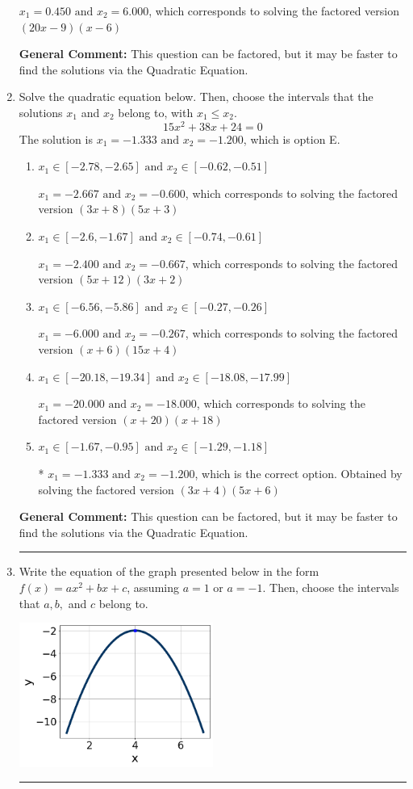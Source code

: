 \documentclass{extbook}[14pt]
\newcommand{\litem}[1]{\item #1

\rule{\textwidth}{0.4pt}}
\begin{document}
\begin{enumerate}
{\begin{enumerate}[label=\Alph*.]
$x_1 = 0.450 \text{ and } x_2 = 6.000$, which corresponds to solving the factored version $(20x -9)(x -6)$
\end{enumerate}

\textbf{General Comment:} This question can be factored, but it may be faster to find the solutions via the Quadratic Equation.
}
\litem{
Solve the quadratic equation below. Then, choose the intervals that the solutions $x_1$ and $x_2$ belong to, with $x_1 \leq x_2$.
\[ 15x^{2} +38 x + 24 = 0 \]The solution is \( x_1 = -1.333 \text{ and } x_2 = -1.200 \), which is option E.\begin{enumerate}[label=\Alph*.]
\item \( x_1 \in [-2.78, -2.65] \text{ and } x_2 \in [-0.62, -0.51] \)

$x_1 = -2.667 \text{ and } x_2 = -0.600$, which corresponds to solving the factored version $(3x + 8)(5x + 3)$
\item \( x_1 \in [-2.6, -1.67] \text{ and } x_2 \in [-0.74, -0.61] \)

$x_1 = -2.400 \text{ and } x_2 = -0.667$, which corresponds to solving the factored version $(5x + 12)(3x + 2)$
\item \( x_1 \in [-6.56, -5.86] \text{ and } x_2 \in [-0.27, -0.26] \)

$x_1 = -6.000 \text{ and } x_2 = -0.267$, which corresponds to solving the factored version $(x + 6)(15x + 4)$
\item \( x_1 \in [-20.18, -19.34] \text{ and } x_2 \in [-18.08, -17.99] \)

$x_1 = -20.000 \text{ and } x_2 = -18.000$, which corresponds to solving the factored version $(x + 20)(x + 18)$
\item \( x_1 \in [-1.67, -0.95] \text{ and } x_2 \in [-1.29, -1.18] \)

* $x_1 = -1.333 \text{ and } x_2 = -1.200$, which is the correct option. Obtained by solving the factored version $(3x + 4)(5x + 6)$
\end{enumerate}

\textbf{General Comment:} This question can be factored, but it may be faster to find the solutions via the Quadratic Equation.
}
\litem{
Write the equation of the graph presented below in the form $f(x)=ax^2+bx+c$, assuming  $a=1$ or $a=-1$. Then, choose the intervals that $a, b,$ and $c$ belong to.

\begin{center}
    \includegraphics[width=0.5\textwidth]{../Figures/quadraticGraphToEquationA.png}
\end{center}


}
\end{enumerate}
\end{document}
